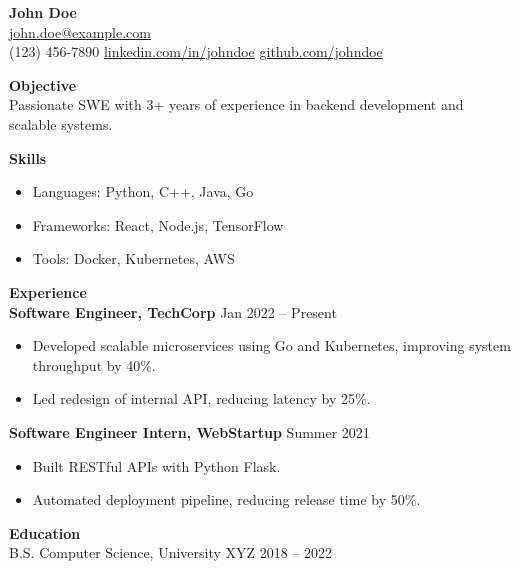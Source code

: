 \documentclass[a4paper,10pt]{article}
\begin{document}
\begin{center}
    {\LARGE \textbf{John Doe}}\\
    \vspace{2pt}
    \href{mailto:john.doe@example.com}{john.doe@example.com} \\
    (123) 456-7890 \quad\textbullet\quad
    \href{https://linkedin.com/in/johndoe}{linkedin.com/in/johndoe} \quad\textbullet\quad
    \href{https://github.com/johndoe}{github.com/johndoe}
\end{center}

\vspace{10pt}
\noindent\textbf{Objective}\\
Passionate SWE with 3+ years of experience in backend development and scalable systems.

\vspace{10pt}
\noindent\textbf{Skills}\\
\begin{itemize}[leftmargin=*]
    \item Languages: Python, C++, Java, Go
    \item Frameworks: React, Node.js, TensorFlow
    \item Tools: Docker, Kubernetes, AWS
\end{itemize}

\vspace{10pt}
\noindent\textbf{Experience}\\
\textbf{Software Engineer, TechCorp} \hfill Jan 2022 -- Present\\
\begin{itemize}[leftmargin=*]
    \item Developed scalable microservices using Go and Kubernetes, improving system throughput by 40\%.
    \item Led redesign of internal API, reducing latency by 25\%.
\end{itemize}

\vspace{5pt}
\textbf{Software Engineer Intern, WebStartup} \hfill Summer 2021\\
\begin{itemize}[leftmargin=*]
    \item Built RESTful APIs with Python Flask.
    \item Automated deployment pipeline, reducing release time by 50\%.
\end{itemize}

\vspace{10pt}
\noindent\textbf{Education}\\
B.S. Computer Science, University XYZ \hfill 2018 -- 2022
\end{document}

